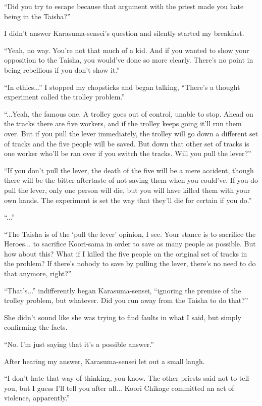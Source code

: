 ``Did you try to escape because that argument with the priest made you hate being in the Taisha?''

I didn't answer Karasuma-sensei's question and silently started my breakfast.

``Yeah, no way. You're not that much of a kid. And if you wanted to show your opposition to the Taisha, you would've done so more clearly. There's no point in being rebellious if you don't show it.''

``In ethics...'' I stopped my chopsticks and began talking, ``There's a thought experiment called the trolley problem.''

``...Yeah, the famous one. A trolley goes out of control, unable to stop. Ahead on the tracks there are five workers, and if the trolley keeps going it'll run them over. But if you pull the lever immediately, the trolley will go down a different set of tracks and the five people will be saved. But down that other set of tracks is one worker who'll be ran over if you switch the tracks. Will you pull the lever?''

``If you don't pull the lever, the death of the five will be a mere accident, though there will be the bitter aftertaste of not saving them when you could've. If you do pull the lever, only one person will die, but you will have killed them with your own hands. The experiment is set the way that they'll die for certain if you do.''

``...''

``The Taisha is of the `pull the lever' opinion, I see. Your stance is to sacrifice the Heroes... to sacrifice Koori-sama in order to save as many people as possible. But how about this? What if I killed the five people on the original set of tracks in the problem? If there's nobody to save by pulling the lever, there's no need to do that anymore, right?''

``That's...'' indifferently began Karasuma-sensei, ``ignoring the premise of the trolley problem, but whatever. Did you run away from the Taisha to do that?''

She didn't sound like she was trying to find faults in what I said, but simply confirming the facts.

``No. I'm just saying that it's a possible answer.''

After hearing my answer, Karasuma-sensei let out a small laugh.

``I don't hate that way of thinking, you know. The other priests said not to tell you, but I guess I'll tell you after all... Koori Chikage committed an act of violence, apparently.''

